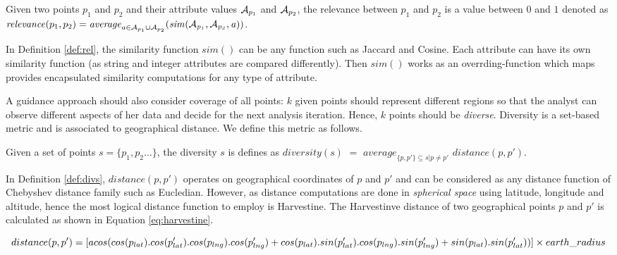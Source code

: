 \begin{definition}[Relevance]
Given two points $p_1$ and $p_2$ and their attribute values ${\cal A}_{p_1}$ and ${\cal A}_{p_2}$, the relevance between $p_1$ and $p_2$ is a value between $0$ and $1$ denoted as $\mathit{relevance}(p_1,p_2) = \mathit{average}_{a \in {\cal A}_{p_1} \cup {\cal A}_{p_2}}(\mathit{sim({\cal A}_{p_1}, {\cal A}_{p_2}, a)})$.
\label{def:rel}
\end{definition}

In Definition \ref{def:rel}, the similarity function $\mathit{sim}()$ can be any function such as Jaccard and Cosine. Each attribute can have its own similarity function (as string and integer attributes are compared differently). Then $\mathit{sim}()$ works as an overrding-function which maps provides encapsulated similarity computations for any type of attribute.

\vspace{5pt}
 A guidance approach should also consider coverage of all points: $k$ given points should represent different regions so that the analyst can observe different aspects of her data and decide for the next analysis iteration. Hence, $k$ points should be {\em diverse}. Diversity is a set-based metric and is associated to geographical distance. We define this metric as follows.

\begin{definition}
Given a set of points $s = \{ p_1, p_2 \dots \}$, the diversity $s$ is defines as $\mathit{diversity}(s)$ $=$ $\mathit{average}_{\{p, p'\} \subseteq s | p \neq p' }$ $\mathit{distance}(p,p')$.
\label{def:divs}
\end{definition}

In Definition \ref{def:divs}, $\mathit{distance}(p,p')$ operates on geographical coordinates of $p$ and $p'$ and can be considered as any distance function of Chebyshev distance family such as Eucledian. However, as distance computations are done in {\em spherical space} using latitude, longitude and altitude, hence the most logical distance function to employ is Harvestine. The Harvestinve distance of two geographical points $p$ and $p'$ is calculated as shown in Equation \ref{eq:harvestine}.

\begin{dmath}
\label{eq:harvestine}
distance(p,p') = [ acos(cos(p_{lat}) . cos(p'_{lat}) . cos(p_{lng}) . cos(p'_{lng})\\ + cos(p_{lat}) . sin(p'_{lat}). cos(p_{lng}) . sin(p'_{lng}) + sin(p_{lat}) . sin(p'_{lat})) ] \times earth\_radius
\end{dmath}

